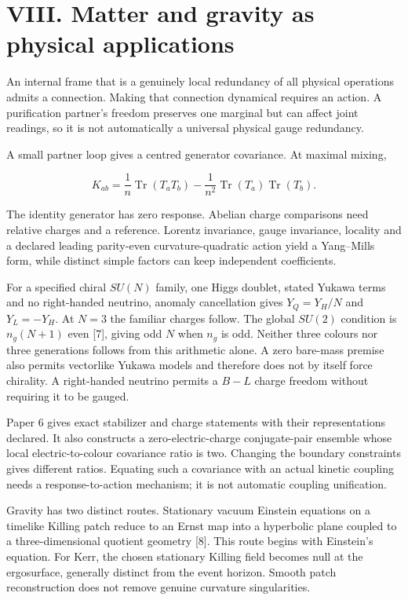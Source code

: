 \documentclass[
  11pt,
  a4paper,
]{article}
\begin{document}
\section{VIII. Matter and gravity as physical applications}\label{viii.-matter-and-gravity-as-physical-applications}

An internal frame that is a genuinely local redundancy of all physical operations admits a connection. Making that connection dynamical requires an action. A purification partner's freedom preserves one marginal but can affect joint readings, so it is not automatically a universal physical gauge redundancy.

A small partner loop gives a centred generator covariance. At maximal mixing,

\[K_{ab}=\frac1n\operatorname{Tr}(T_aT_b)
-\frac1{n^2}\operatorname{Tr}(T_a)\operatorname{Tr}(T_b).\]

The identity generator has zero response. Abelian charge comparisons need relative charges and a reference. Lorentz invariance, gauge invariance, locality and a declared leading parity-even curvature-quadratic action yield a Yang--Mills form, while distinct simple factors can keep independent coefficients.

For a specified chiral \(SU(N)\) family, one Higgs doublet, stated Yukawa terms and no right-handed neutrino, anomaly cancellation gives \(Y_Q=Y_H/N\) and \(Y_L=-Y_H\). At \(N=3\) the familiar charges follow. The global \(SU(2)\) condition is \(n_g(N+1)\) even {[}7{]}, giving odd \(N\) when \(n_g\) is odd. Neither three colours nor three generations follows from this arithmetic alone. A zero bare-mass premise also permits vectorlike Yukawa models and therefore does not by itself force chirality. A right-handed neutrino permits a \(B-L\) charge freedom without requiring it to be gauged.

Paper 6 gives exact stabilizer and charge statements with their representations declared. It also constructs a zero-electric-charge conjugate-pair ensemble whose local electric-to-colour covariance ratio is two. Changing the boundary constraints gives different ratios. Equating such a covariance with an actual kinetic coupling needs a response-to-action mechanism; it is not automatic coupling unification.

Gravity has two distinct routes. Stationary vacuum Einstein equations on a timelike Killing patch reduce to an Ernst map into a hyperbolic plane coupled to a three-dimensional quotient geometry {[}8{]}. This route begins with Einstein's equation. For Kerr, the chosen stationary Killing field becomes null at the ergosurface, generally distinct from the event horizon. Smooth patch reconstruction does not remove genuine curvature singularities.
\end{document}
